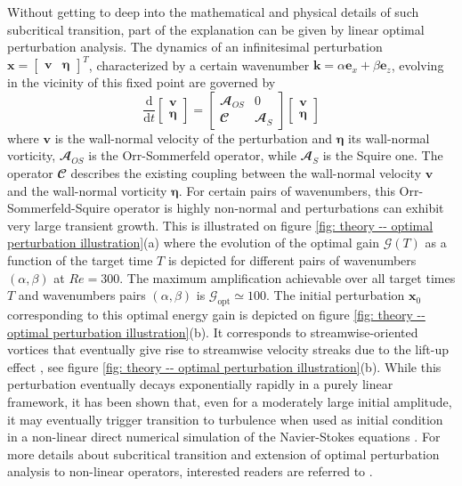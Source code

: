      Without getting to deep into the mathematical and physical details of such subcritical transition, part of the explanation can be given by linear optimal perturbation analysis. The dynamics of an infinitesimal perturbation $\mathbf{x} = \begin{bmatrix} \mathbf{v} & \mathbf{\eta} \end{bmatrix}^T$, characterized by a certain wavenumber $\mathbf{k} = \alpha \mathbf{e}_x + \beta \mathbf{e}_z$, evolving in the vicinity of this fixed point are governed by
      \begin{equation}
        \displaystyle \frac{\mathrm{d}}{\mathrm{d}t} \begin{bmatrix} \mathbf{v} \\ \mathbf{\eta} \end{bmatrix} = \begin{bmatrix} \mathbfcal{A}_{OS} & 0 \\ \mathbfcal{C} & \mathbfcal{A}_{S} \end{bmatrix} \begin{bmatrix} \mathbf{v} \\ \mathbf{\eta} \end{bmatrix}
        \label{eq: theory -- orr-sommerfeld-squire equations}
      \end{equation}
      where $\mathbf{v}$ is the wall-normal velocity of the perturbation and $\mathbf{\eta}$ its wall-normal vorticity, $\mathbfcal{A}_{OS}$ is the Orr-Sommerfeld operator, while $\mathbfcal{A}_{S}$ is the Squire one. The operator $\mathbfcal{C}$ describes the existing coupling between the wall-normal velocity $\mathbf{v}$ and the wall-normal vorticity $\mathbf{\eta}$. For certain pairs of wavenumbers, this Orr-Sommerfeld-Squire operator is highly non-normal and perturbations can exhibit very large transient growth. This is illustrated on figure \ref{fig: theory -- optimal perturbation illustration}(a) where the evolution of the optimal gain $\mathcal{G}(T)$ as a function of the target time $T$ is depicted for different pairs of wavenumbers $(\alpha, \beta)$ at $Re=300$. The maximum amplification achievable over all target times $T$ and wavenumbers pairs $(\alpha, \beta)$ is $\mathcal{G}_{\mathrm{opt}} \simeq 100$. The initial perturbation $\mathbf{x}_0$ corresponding to this optimal energy gain is depicted on figure \ref{fig: theory -- optimal perturbation illustration}(b). It corresponds to streamwise-oriented vortices that eventually give rise to streamwise velocity streaks due to the lift-up effect \cite{jfm:landahl:1980, ejmbf:brandt:2014}, see figure \ref{fig: theory -- optimal perturbation illustration}(b). While this perturbation eventually decays exponentially rapidly in a purely linear framework, it has been shown that, even for a moderately large initial amplitude, it may eventually trigger transition to turbulence when used as initial condition in a non-linear direct numerical simulation of the Navier-Stokes equations \cite{LB2014}. For more details about subcritical transition and extension of optimal perturbation analysis to non-linear operators, interested readers are referred to \cite{K2018}.

